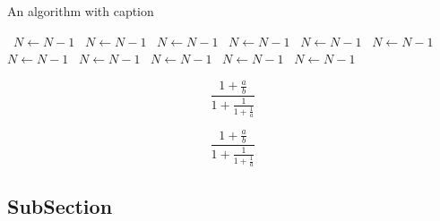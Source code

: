 \documentclass[a4paper]{article}
\begin{document}
\begin{algorithm}
\caption{An algorithm with caption}
\begin{algorithmic}
\    \State $N \gets N - 1$
\    \State $N \gets N - 1$
\    \State $N \gets N - 1$
\    \State $N \gets N - 1$
\    \State $N \gets N - 1$
\    \State $N \gets N - 1$
\    \State $N \gets N - 1$
\    \State $N \gets N - 1$
\    \State $N \gets N - 1$
\    \State $N \gets N - 1$
\    \State $N \gets N - 1$
\EndWhile
\end{algorithmic}
\end{algorithm}

\[ \frac{1+\frac{a}{b}}{1+\frac{1}{1+\frac{1}{a}}} \]

\[ \frac{1+\frac{a}{b}}{1+\frac{1}{1+\frac{1}{a}}} \]

\subsection{SubSection}
\end{document}
